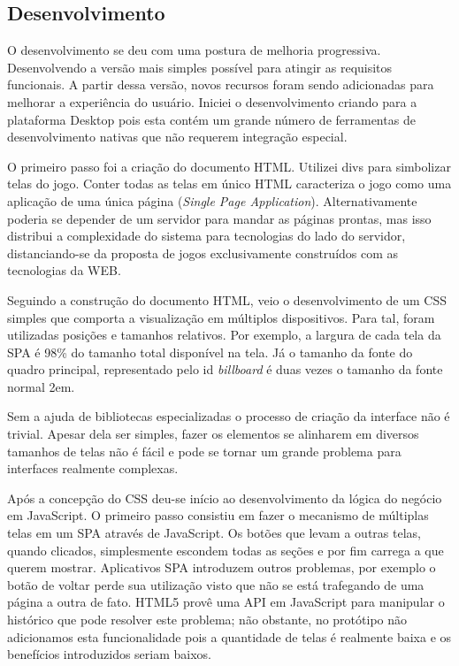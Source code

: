 \begin{draft}
\section{Desenvolvimento}

O desenvolvimento se deu com uma postura de melhoria progressiva.
Desenvolvendo a versão mais simples possível para atingir as
requisitos funcionais. A partir dessa versão, novos recursos foram
sendo adicionadas para melhorar a experiência do usuário. Iniciei o
desenvolvimento criando para a plataforma Desktop pois esta contém
um grande número de ferramentas de desenvolvimento nativas que não
requerem integração especial.

O primeiro passo foi a criação do documento HTML. Utilizei divs
para simbolizar telas do jogo. Conter todas as telas em único
HTML caracteriza o jogo como uma aplicação de uma única página
(\textit{Single Page Application}). Alternativamente poderia se depender
de um servidor para mandar as páginas prontas, mas isso distribui
a complexidade do sistema para tecnologias do lado do servidor,
distanciando-se da proposta de jogos exclusivamente construídos com as
tecnologias da WEB.

Seguindo a construção do documento HTML, veio o desenvolvimento de um
CSS simples que comporta a visualização em múltiplos dispositivos.
Para tal, foram utilizadas posições e tamanhos relativos. Por exemplo,
a largura de cada tela da SPA é 98\% do tamanho total disponível na
tela. Já o tamanho da fonte do quadro principal, representado pelo id
\textit{billboard} é duas vezes o tamanho da fonte normal 2em.

Sem a ajuda de bibliotecas especializadas o processo de criação da
interface não é trivial. Apesar dela ser simples, fazer os
elementos se alinharem em diversos tamanhos de telas não é fácil e
pode se tornar um grande problema para interfaces realmente complexas.

Após a concepção do CSS deu-se início ao desenvolvimento da lógica
do negócio em JavaScript. O primeiro passo consistiu em fazer o
mecanismo de múltiplas telas em um SPA através de JavaScript. Os
botões que levam a outras telas, quando clicados, simplesmente escondem
todas as seções e por fim carrega a que querem mostrar. Aplicativos
SPA introduzem outros problemas, por exemplo o botão de voltar
perde sua utilização visto que não se está trafegando de uma página
a outra de fato. HTML5 provê uma API em JavaScript para manipular o histórico
que pode resolver este problema; não obstante, no protótipo não
adicionamos esta funcionalidade pois a quantidade de telas é realmente
baixa e os benefícios introduzidos seriam baixos.


\end{draft}
